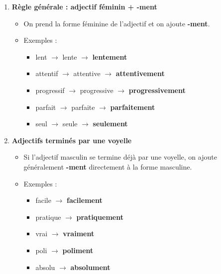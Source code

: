 \documentclass[math,code]{amznotes}
\theoremstyle{remark}
\begin{document}
\begin{enumerate}
    \item \textbf{Règle générale : adjectif féminin + -ment}
    \begin{itemize}
        \item On prend la forme féminine de l'adjectif et on ajoute \textbf{-ment}.
        \item Exemples :
        \begin{itemize}
            \item lent $\rightarrow$ lente $\rightarrow$ \textbf{lentement}
            \item attentif $\rightarrow$ attentive $\rightarrow$ \textbf{attentivement}
            \item progressif $\rightarrow$ progressive $\rightarrow$ \textbf{progressivement}
            \item parfait $\rightarrow$ parfaite $\rightarrow$ \textbf{parfaitement}
            \item seul $\rightarrow$ seule $\rightarrow$ \textbf{seulement}
        \end{itemize}
    \end{itemize}

    \item \textbf{Adjectifs terminés par une voyelle}
    \begin{itemize}
        \item Si l'adjectif masculin se termine déjà par une voyelle, on ajoute généralement \textbf{-ment} directement à la forme masculine.
        \item Exemples :
        \begin{itemize}
            \item facile $\rightarrow$ \textbf{facilement}
            \item pratique $\rightarrow$ \textbf{pratiquement}
            \item vrai $\rightarrow$ \textbf{vraiment}
            \item poli $\rightarrow$ \textbf{poliment}
            \item absolu $\rightarrow$ \textbf{absolument}
        \end{itemize}
    \end{itemize}


\end{enumerate}
\end{document}
